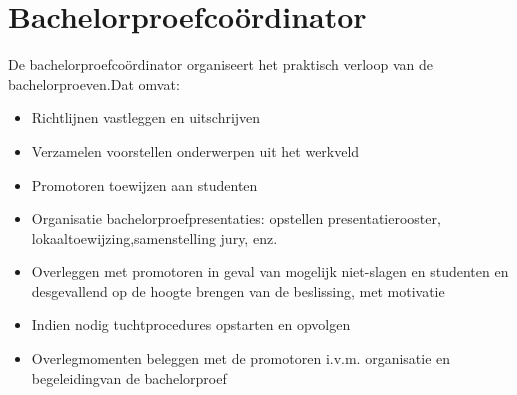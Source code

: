 \section{Bachelorproefcoördinator}
De bachelorproefcoördinator organiseert het praktisch verloop van de bachelorproeven.Dat omvat:
\begin{itemize}
	\item Richtlijnen vastleggen en uitschrijven
	\item Verzamelen voorstellen onderwerpen uit het werkveld
	\item Promotoren toewijzen aan studenten
	\item Organisatie bachelorproefpresentaties: opstellen presentatierooster, lokaaltoewijzing,samenstelling jury, enz.
	\item Overleggen met promotoren in geval van mogelijk niet-slagen en studenten en desgevallend op de hoogte brengen van de beslissing, met motivatie
	\item Indien nodig tuchtprocedures opstarten en opvolgen
	\item Overlegmomenten beleggen met de promotoren i.v.m. organisatie en begeleidingvan de bachelorproef

\end{itemize}


